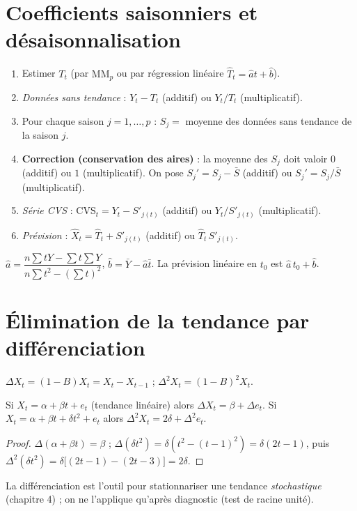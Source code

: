 \documentclass[11pt]{report}
\begin{document}
\section{Coefficients saisonniers et désaisonnalisation}
\begin{methode}
\begin{enumerate}[leftmargin=*,nosep]
\item Estimer $T_t$ (par $\mathrm{MM}_p$ ou par régression linéaire $\hat T_t=\hat a t+\hat b$).
\item \emph{Données sans tendance} : $Y_t-T_t$ (additif) ou $Y_t/T_t$ (multiplicatif).
\item Pour chaque saison $j=1,\dots,p$ : $S_j=$ moyenne des données sans tendance de la saison $j$.
\item \textbf{Correction (conservation des aires)} : la moyenne des $S_j$ doit valoir $0$
(additif) ou $1$ (multiplicatif). On pose $S_j'=S_j-\bar S$ (additif) ou $S_j'=S_j/\bar S$
(multiplicatif).
\item \emph{Série CVS} : $\text{CVS}_t=Y_t-S'_{j(t)}$ (additif) ou $Y_t/S'_{j(t)}$ (multiplicatif).
\item \emph{Prévision} : $\widehat X_t=\hat T_t+S'_{j(t)}$ (additif) ou $\hat T_t\,S'_{j(t)}$.
\end{enumerate}
\end{methode}
\begin{recette}
$\hat a=\dfrac{n\sum tY-\sum t\sum Y}{n\sum t^2-(\sum t)^2}$, $\hat b=\bar Y-\hat a\bar t$.
La prévision linéaire en $t_0$ est $\hat a\,t_0+\hat b$.
\end{recette}

\section{Élimination de la tendance par différenciation}
\begin{definition}
$\Delta X_t=(1-B)X_t=X_t-X_{t-1}$ ; $\Delta^2X_t=(1-B)^2X_t$.
\end{definition}
\begin{proposition}\label{prop:diff}
Si $X_t=\alpha+\beta t+e_t$ (tendance linéaire) alors $\Delta X_t=\beta+\Delta e_t$.
Si $X_t=\alpha+\beta t+\delta t^2+e_t$ alors $\Delta^2X_t=2\delta+\Delta^2e_t$.
\end{proposition}
\begin{proof}
$\Delta(\alpha+\beta t)=\beta$ ; $\Delta(\delta t^2)=\delta(t^2-(t-1)^2)=\delta(2t-1)$, puis
$\Delta^2(\delta t^2)=\delta\big[(2t-1)-(2t-3)\big]=2\delta$.
\end{proof}
La différenciation est l'outil pour stationnariser une tendance \emph{stochastique}
(chapitre 4) ; on ne l'applique qu'après diagnostic (test de racine unité).
\end{document}
